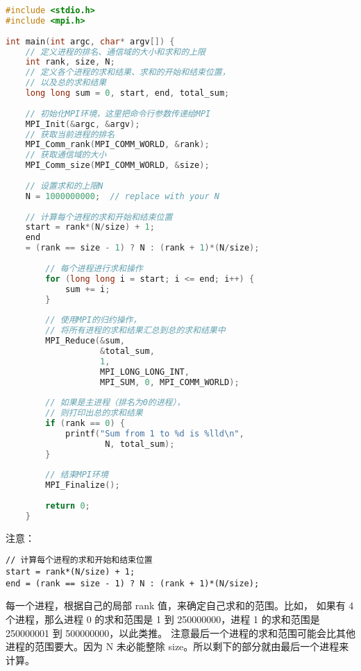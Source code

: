 \documentclass{ctexart}
\begin{document}
\begin{lstlisting}[language=C]
#include <stdio.h>    
#include <mpi.h>    
        
int main(int argc, char* argv[]) {    
    // 定义进程的排名、通信域的大小和求和的上限  
    int rank, size, N;    
    // 定义各个进程的求和结果、求和的开始和结束位置，
    // 以及总的求和结果  
    long long sum = 0, start, end, total_sum;    
        
    // 初始化MPI环境，这里把命令行参数传递给MPI  
    MPI_Init(&argc, &argv);     
    // 获取当前进程的排名  
    MPI_Comm_rank(MPI_COMM_WORLD, &rank);     
    // 获取通信域的大小  
    MPI_Comm_size(MPI_COMM_WORLD, &size);     
        
    // 设置求和的上限N  
    N = 1000000000;  // replace with your N    
        
    // 计算每个进程的求和开始和结束位置  
    start = rank*(N/size) + 1;    
    end 
    = (rank == size - 1) ? N : (rank + 1)*(N/size);    
        
        // 每个进程进行求和操作  
        for (long long i = start; i <= end; i++) {    
            sum += i;    
        }    
        
        // 使用MPI的归约操作，
        // 将所有进程的求和结果汇总到总的求和结果中  
        MPI_Reduce(&sum, 
                   &total_sum, 
                   1, 
                   MPI_LONG_LONG_INT, 
                   MPI_SUM, 0, MPI_COMM_WORLD);    
        
        // 如果是主进程（排名为0的进程），
        // 则打印出总的求和结果  
        if (rank == 0) {    
            printf("Sum from 1 to %d is %lld\n", 
                    N, total_sum);    
        }    
        
        // 结束MPI环境  
        MPI_Finalize();    
        
        return 0;    
    }    
\end{lstlisting}

注意：
\begin{verbatim}
// 计算每个进程的求和开始和结束位置  
start = rank*(N/size) + 1;    
end = (rank == size - 1) ? N : (rank + 1)*(N/size);      
\end{verbatim}
每一个进程，根据自己的局部 rank 值，来确定自己求和的范围。比如，
如果有 4 个进程，那么进程 0 的求和范围是 1 到 250000000，进程 1 的求和范围是 250000001 到 500000000，以此类推。
注意最后一个进程的求和范围可能会比其他进程的范围要大。因为 N 未必能整除 size。所以剩下的部分就由最后一个进程来计算。
\end{document}
